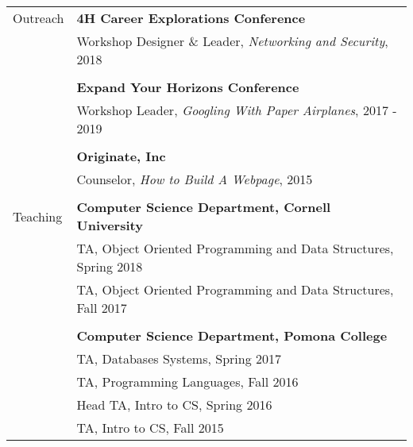 \documentclass[letterpaper,10pt,oneside]{article}
\begin{document}
\begin{tabular}{@{} l l }
            
  \Large{Outreach}
       & \textbf{4H Career Explorations Conference} \\
       & Workshop Designer \& Leader, \emph{Networking and Security}, 2018 \\
       & \\    
       & \textbf{Expand Your Horizons Conference} \\
       & Workshop Leader, \emph{Googling With Paper Airplanes}, 2017 - 2019 \\
       & \\
       & \textbf{Originate, Inc} \\
       & Counselor, \emph{How to Build A Webpage}, 2015 \\
       & \\
 
  \Large{Teaching}
       & \textbf{Computer Science Department, Cornell University} \\
  
       & TA, Object Oriented Programming and Data Structures, Spring 2018 \\
  
       & TA, Object Oriented Programming and Data Structures, Fall 2017 \\
       &\\
  
       & \textbf{Computer Science Department, Pomona College} \\ 
  
       & TA, Databases Systems, Spring 2017 \\
  
       & TA, Programming Languages, Fall 2016 \\
  
       & Head TA, Intro to CS, Spring 2016 \\
  
       & TA, Intro to CS, Fall 2015 \\
  

\end{tabular}
\end{document}
